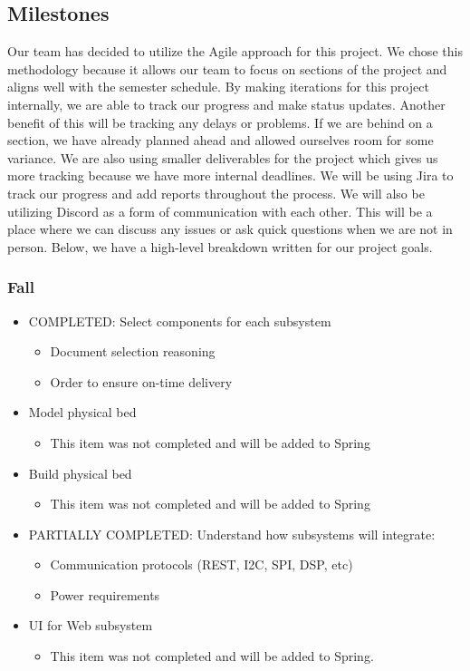 \subsection{Milestones}
Our team has decided to utilize the Agile approach for this project. We chose this methodology because it allows our team to focus on sections of the project and aligns well with the semester schedule. By making iterations for this project internally, we are able to track our progress and make status updates. Another benefit of this will be tracking any delays or problems. If we are behind on a section, we have already planned ahead and allowed ourselves room for some variance. We are also using smaller deliverables for the project which gives us more tracking because we have more internal deadlines. We will be using Jira to track our progress and add reports throughout the process. We will also be utilizing Discord as a form of communication with each other. This will be a place where we can discuss any issues or ask quick questions when we are not in person. Below, we have a high-level breakdown written for our project goals.
\subsubsection{Fall}
\begin{itemize}
    \item COMPLETED: Select components for each subsystem
    \begin{itemize}
        \item Document selection reasoning
        \item Order to ensure on-time delivery
    \end{itemize}
    \item Model physical bed
    \begin{itemize}
        \item This item was not completed and will be added to Spring
    \end{itemize}
    \item Build physical bed
    \begin{itemize}
        \item This item was not completed and will be added to Spring
    \end{itemize}
    \item PARTIALLY COMPLETED: Understand how subsystems will integrate:
    \begin{itemize}
        \item Communication protocols (REST, I2C, SPI, DSP, etc)
        \item Power requirements
    \end{itemize}
    \item UI for Web subsystem
    \begin{itemize}
        \item This item was not completed and will be added to Spring.
    \end{itemize}
\end{itemize}
